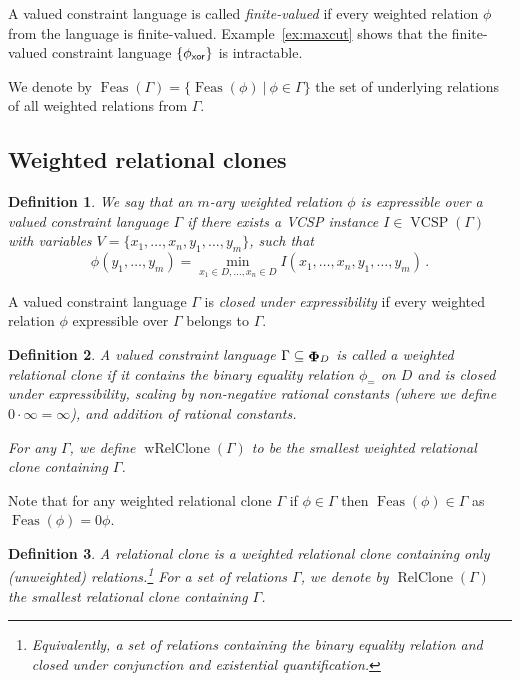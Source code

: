 \documentclass[11pt, reqno]{article}
\newcommand{\inst}{\ensuremath{I}}
\DeclareMathOperator{\wrel}{{\bf \Phi}}
\DeclareMathOperator{\VCSP}{VCSP}
\DeclareMathOperator{\feas}{Feas}
\DeclareMathOperator{\dom}{{Feas}}
\DeclareMathOperator{\wrelclone}{wRelClone}
\DeclareMathOperator{\relclone}{RelClone}
\newtheorem{definition}{Definition}
\theoremstyle{remark}
\begin{document}
A valued constraint language is called \emph{finite-valued} if every weighted
relation $\phi$ from the language is finite-valued. 
%
Example~\ref{ex:maxcut} shows that the finite-valued constraint language
$\{\phi_{\sf xor}\}$ is intractable. 

We denote by $\feas(\Gamma)=\{\dom(\phi)\:|\:\phi\in\Gamma\}$ the set of
underlying relations of all weighted relations from $\Gamma$.

\subsection{Weighted relational clones}
%
\begin{definition} \label{def:expres}
We say that an $m$-ary weighted relation $\phi$ is \emph{expressible} over a valued constraint
language $\Gamma$ if there exists a VCSP instance $\inst \in \VCSP(\Gamma)$ 
with variables $V=\{x_1,\ldots,x_n,y_1,\ldots,y_m\}$,
such that
\begin{equation}
\phi(y_1,\ldots,y_m) = \min_{x_1\in D,\ldots,x_n\in D}\inst(x_1,\ldots,x_n,y_1,\ldots,y_m)\,.
\end{equation}
\end{definition}
%
A valued constraint language $\Gamma$ is \emph{closed under expressibility} if
every weighted relation $\phi$ expressible over $\Gamma$ belongs to $\Gamma$.
%
\begin{definition}
\label{defn:wrelclone}
A valued constraint language $\Gamma \subseteq \wrel_D$ is called a \emph{weighted relational clone} 
if it contains the binary equality relation $\phi_=$ on $D$ and is closed under
expressibility, scaling by non-negative rational constants (where we define
$0\cdot\infty=\infty$),
and addition of rational constants.

For any $\Gamma$, we define $\wrelclone(\Gamma)$ to be the smallest weighted relational clone containing $\Gamma$.
\end{definition}

Note that for any weighted relational clone $\Gamma$ if $\phi\in\Gamma$ then
$\feas(\phi)\in\Gamma$ as $\feas(\phi)=0\phi$. 
%

\begin{definition}
A \emph{relational clone} is a weighted
relational clone containing only (unweighted) relations.\footnote{Equivalently,
a set of relations containing the binary equality relation and closed under
conjunction and existential quantification.} For a set of relations $\Gamma$, we
denote by $\relclone(\Gamma)$ the smallest relational clone containing $\Gamma$.
\end{definition}
\end{document}
